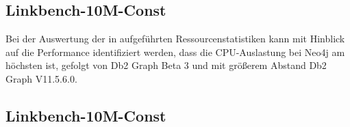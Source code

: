 \subsection{Linkbench-10M-Const}
Bei der Auswertung der in  aufgeführten Ressourcenstatistiken kann mit Hinblick auf die Performance identifiziert werden, dass die CPU-Auslastung bei Neo4j am höchsten ist, gefolgt von Db2 Graph Beta 3 und mit größerem Abstand Db2 Graph V11.5.6.0. 

\subsection{Linkbench-10M-Const}




\listoftodos
